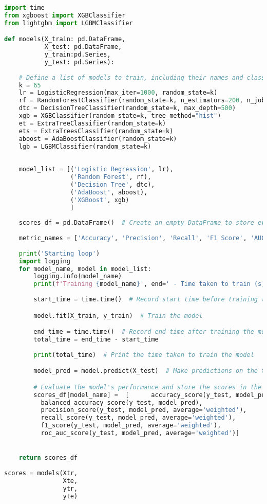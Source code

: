 \documentclass[12pt, a4paper,twoside]{report}
\numberwithin{equation}{chapter}
\begin{document}
\begin{lstlisting}[language=Python]
import time
from xgboost import XGBClassifier
from lightgbm import LGBMClassifier

def models(X_train: pd.DataFrame,
           X_test: pd.DataFrame,
           y_train:pd.Series,
           y_test: pd.Series):
    
    # Define a list of models to train, including their names and classes
    k = 65
    lr = LogisticRegression(max_iter=1000, random_state=k)
    rf = RandomForestClassifier(random_state=k, n_estimators=200, n_jobs=-1)
    dtc = DecisionTreeClassifier(random_state=k, max_depth=500)
    xgb = XGBClassifier(random_state=k, tree_method="hist")
    et = ExtraTreeClassifier(random_state=k)
    ets = ExtraTreesClassifier(random_state=k)
    aboost = AdaBoostClassifier(random_state=k)
    lgb = LGBMClassifier(random_state=k)
    
    
    model_list = [('Logistic Regression', lr),
                  ('Random Forest', rf),
                  ('Decision Tree', dtc),
                  ('AdaBoost', aboost),
                  ('XGBoost', xgb)
                  ]
    
    scores_df = pd.DataFrame()  # Create an empty DataFrame to store evaluation scores
    
    metric_names = ['Accuracy', 'Precision', 'Recall', 'F1 Score', 'AUC']
    
    print('Starting loop')
    import logging
    for model_name, model in model_list:
        logging.info(model_name)
        print(f'Training {model_name}', end=' - Time taken to train (s): ')
        
        start_time = time.time()  # Record start time before training the model

        model.fit(X_train, y_train)  # Train the model

        end_time = time.time()  # Record end time after training the model
        total_time = end_time - start_time
        
        print(total_time)  # Print the time taken to train the model

        model_pred = model.predict(X_test)  # Make predictions on the test data

        # Evaluate the model's performance and store the scores in the DataFrame
        scores_df[model_name] =  [      accuracy_score(y_test, model_pred),
          balanced_accuracy_score(y_test, model_pred),
          precision_score(y_test, model_pred, average='weighted'),
          recall_score(y_test, model_pred, average='weighted'),
          f1_score(y_test, model_pred, average='weighted'),
          roc_auc_score(y_test, model_pred, average='weighted')]


    return scores_df
        
scores = models(Xtr,
                Xte,
                ytr,
                yte)

\end{lstlisting}
\end{document}
